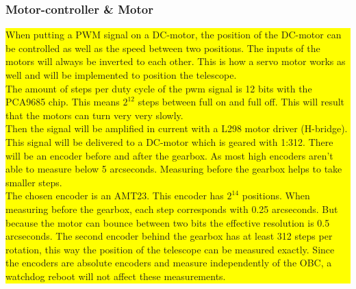 \subsubsection{Motor-controller \& Motor}
\colorbox{yellow}{\parbox{\textwidth}{
When putting a PWM signal on a DC-motor, the position of the DC-motor can be controlled as well as the speed between two positions. The inputs of the motors will always be inverted to each other. This is how a servo motor works as well and will be implemented to position the telescope.\\

The amount of steps per duty cycle of the pwm signal is 12 bits with the PCA9685 chip. This means $2^{12}$ steps between full on and full off. This will result that the motors can turn very very slowly.\\

Then the signal will be amplified in current with a L298 motor driver (H-bridge). This signal will be delivered to a DC-motor which is geared with 1:312. There will be an encoder before and after the gearbox. As most high encoders aren't able to measure below 5 arcseconds. Measuring before the gearbox helps to take smaller steps.\\

The chosen encoder is an AMT23. This encoder has $2^{14}$ positions. When measuring before the gearbox, each step corresponds with 0.25 arcseconds. But because the motor can bounce between two bits the effective resolution is 0.5 arcseconds. The second encoder behind the gearbox has at least 312 steps per rotation, this way the position of the telescope can be measured exactly. Since the encoders are absolute encoders and measure independently of the OBC, a watchdog reboot will not affect these measurements.
}}

